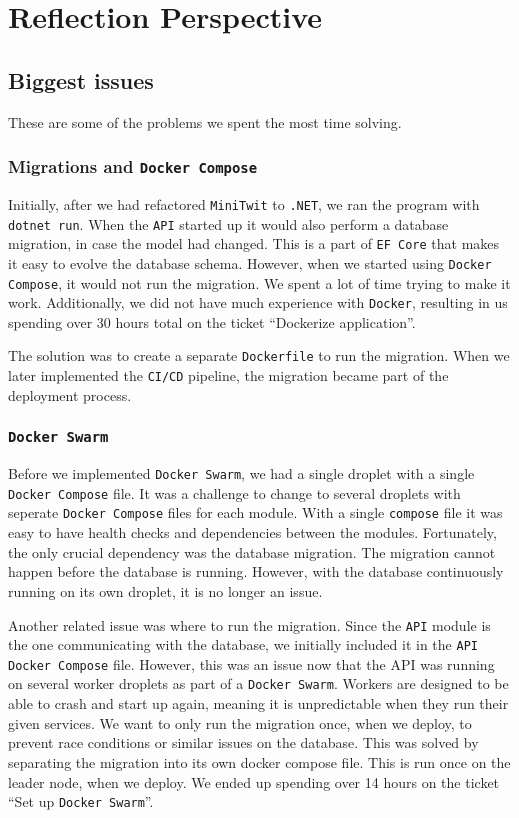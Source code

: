 \section{Reflection Perspective}

\subsection{Biggest issues}

These are some of the problems we spent the most time solving.

\subsubsection{Migrations and \texttt{Docker Compose}}

Initially, after we had refactored \texttt{MiniTwit} to \texttt{.NET},
we ran the program with \texttt{dotnet run}. 
When the \texttt{API} started up it would also perform a database migration,
in case the model had changed. This is a part of \texttt{EF Core}
that makes it easy to evolve the database schema.
However, when we started using \texttt{Docker Compose}, 
it would not run the migration.
We spent a lot of time trying to make it work.
Additionally, we did not have much experience with \texttt{Docker},
resulting in us spending over 30 hours total on the ticket
``Dockerize application''.

The solution was to create a separate \texttt{Dockerfile} 
to run the migration.
When we later implemented the \texttt{CI/CD} pipeline, 
the migration became part of the deployment process.

\subsubsection{\texttt{Docker Swarm}}

Before we implemented \texttt{Docker Swarm}, we had a single droplet 
with a single \texttt{Docker Compose} file.
It was a challenge to change to several droplets with 
seperate \texttt{Docker Compose} files for each module.
With a single \texttt{compose} file it was easy to have health checks and
dependencies between the modules. 
Fortunately, the only crucial dependency was the database migration.
The migration cannot happen before the database is running.
However, with the database continuously running on its own droplet,
it is no longer an issue.

Another related issue was where to run the migration.
Since the \texttt{API} module is the one communicating with the database,
we initially included it in the \texttt{API Docker Compose} file.
However, this was an issue now that the API was running on several 
worker droplets as part of a \texttt{Docker Swarm}. Workers are designed
to be able to crash and start up again, 
meaning it is unpredictable when they run their given services.
We want to only run the migration once, when we deploy, to
prevent race conditions or similar issues on the database.
This was solved by separating the migration into its own docker compose file.
This is run once on the leader node, when we deploy.
We ended up spending over 14 hours on the ticket ``Set up \texttt{Docker Swarm}''.

